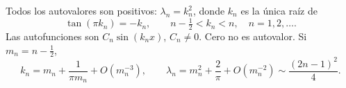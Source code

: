 Todos los autovalores son positivos: $\lambda_n=k_n^2$, donde $k_n$ es la única raíz de
\[\tan(\pi k_n)=-k_n,\qquad n-\tfrac12<k_n<n,\quad n=1,2,\ldots.\]
Las autofunciones son $C_n\sin(k_nx)$, $C_n\ne0$. Cero no es autovalor. Si $m_n=n-\tfrac12$,
\[k_n=m_n+\frac1{\pi m_n}+O(m_n^{-3}),\qquad\lambda_n=m_n^2+\frac2\pi+O(m_n^{-2})\sim\frac{(2n-1)^2}{4}.\]
